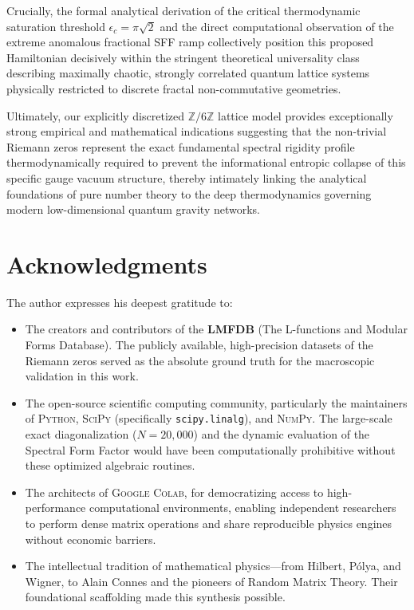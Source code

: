 \documentclass[aps,prl,preprint,superscriptaddress,floatfix]{revtex4-2}
\newcommand{\Zmod}{\mathbb{Z}/6\mathbb{Z}}
\begin{document}
Crucially, the formal analytical derivation of the critical thermodynamic saturation threshold $\epsilon_c = \pi\sqrt{2}$ and the direct computational observation of the extreme anomalous fractional SFF ramp collectively position this proposed Hamiltonian decisively within the stringent theoretical universality class describing maximally chaotic, strongly correlated quantum lattice systems physically restricted to discrete fractal non-commutative geometries.

Ultimately, our explicitly discretized $\Zmod$ lattice model provides exceptionally strong empirical and mathematical indications suggesting that the non-trivial Riemann zeros represent the exact fundamental spectral rigidity profile thermodynamically required to prevent the informational entropic collapse of this specific gauge vacuum structure, thereby intimately linking the analytical foundations of pure number theory to the deep thermodynamics governing modern low-dimensional quantum gravity networks.

\section*{Acknowledgments}
The author expresses his deepest gratitude to:

\begin{itemize}
    \item The creators and contributors of the \textbf{LMFDB} (The L-functions and Modular Forms Database). The publicly available, high-precision datasets of the Riemann zeros served as the absolute ground truth for the macroscopic validation in this work.
    \item The open-source scientific computing community, particularly the maintainers of \textsc{Python}, \textsc{SciPy} (specifically \texttt{scipy.linalg}), and \textsc{NumPy}. The large-scale exact diagonalization ($N=20,000$) and the dynamic evaluation of the Spectral Form Factor would have been computationally prohibitive without these optimized algebraic routines.
    \item The architects of \textsc{Google Colab}, for democratizing access to high-performance computational environments, enabling independent researchers to perform dense matrix operations and share reproducible physics engines without economic barriers.
    \item The intellectual tradition of mathematical physics—from Hilbert, Pólya, and Wigner, to Alain Connes and the pioneers of Random Matrix Theory. Their foundational scaffolding made this synthesis possible.
\end{itemize}
\end{document}
